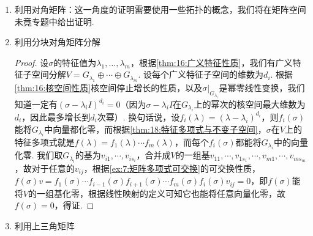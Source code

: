\begin{enumerate}
    \item 利用对角矩阵：这一角度的证明需要使用一些拓扑的概念，我们将在矩阵空间未竟专题中给出证明.

    \item 利用分块对角矩阵分解

          \begin{proof}
            设$\sigma$的特征值为$\lambda_1,\ldots,\lambda_m$，根据\autoref{thm:16:广义特征性质}，我们有广义特征子空间分解$V=G_{\lambda_1}\oplus\cdots\oplus G_{\lambda_m}$. 设每个广义特征子空间的维数为$d_i$. 根据\autoref{thm:16:核空间性质}核空间停止增长的性质，以及$\sigma\vert_{G_{\lambda_i}}$是幂零线性变换，我们知道一定有$(\sigma-\lambda_iI)^{d_i}=0$（因为$\sigma-\lambda_iI$在$G_{\lambda_i}$上的幂次的核空间最大维数为$d_i$，因此最多增长到$d_i$次幂）. 换句话说，设$f_i(\lambda)=(\lambda-\lambda_i)^{d_i}$，则$f_i(\sigma)$能将$G_{\lambda_i}$中向量都化零，而根据\autoref{thm:18:特征多项式与不变子空间}，$\sigma$在$V$上的特征多项式就是$f(\lambda)=f_1(\lambda)\cdots f_m(\lambda)$，而每个$f_i(\sigma)$都能将$G_{\lambda_i}$中的向量化零. 我们取$G_{\lambda_i}$的基为$v_{i1},\cdots,v_{is_i}$，合并成$V$的一组基$v_{11},\cdots,v_{1s_1},\cdots,v_{m1},\cdots,v_{ms_m}$，故对于任意的$v_{ij}$，根据\autoref{ex:7:矩阵多项式可交换}的可交换性质，$f(\sigma)v=f_1(\sigma)\cdots f_{i-1}(\sigma)f_{i+1}(\sigma)\cdots f_m(\sigma)f_i(\sigma)v_{ij}=0$，即$f(\sigma)$能将$V$的一组基化零，根据线性映射的定义可知它也能将任意向量化零，故$f(\sigma)=0$，得证.
          \end{proof}

    \item 利用上三角矩阵


\end{enumerate}
